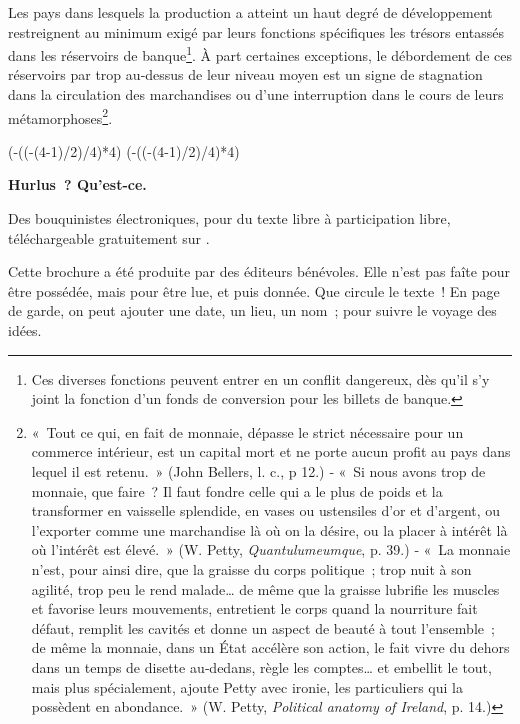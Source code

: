 \documentclass[french,twoside]{book} %
\def\truncdiv#1#2{((#1-(#2-1)/2)/#2)}
\def\moduloop#1#2{(#1-\truncdiv{#1}{#2}*#2)}
\def\modulo#1#2{\number\numexpr\moduloop{#1}{#2}\relax}
\begin{document}
Les pays dans lesquels la production a atteint un haut degré de développement restreignent au minimum exigé par leurs fonctions spécifiques les trésors entassés dans les réservoirs de banque\footnote{Ces diverses fonctions peuvent entrer en un conflit dangereux, dès qu’il s’y joint la fonction d’un fonds de conversion pour les billets de banque.}. À part certaines exceptions, le débordement de ces réservoirs par trop au‑dessus de leur niveau moyen est un signe de stagnation dans la circulation des marchandises ou d’une interruption dans le cours de leurs métamorphoses\footnote{« Tout ce qui, en fait de monnaie, dépasse le strict nécessaire pour un commerce intérieur, est un capital mort et ne porte aucun profit au pays dans lequel il est retenu. » (John Bellers, l. c., p 12.) ‑ « Si nous avons trop de monnaie, que faire ? Il faut fondre celle qui a le plus de poids et la transformer en vaisselle splendide, en vases ou ustensiles d’or et d’argent, ou l’exporter comme une marchandise là où on la désire, ou la placer à intérêt là où l’intérêt est élevé. » (W. Petty, \emph{Quantulumeumque}, p. 39.) ‑ « La monnaie n’est, pour ainsi dire, que la graisse du corps politique ; trop nuit à son agilité, trop peu le rend malade… de même que la graisse lubrifie les muscles et favorise leurs mouvements, entretient le corps quand la nourriture fait défaut, remplit les cavités et donne un aspect de beauté à tout l’ensemble ; de même la monnaie, dans un État accélère son action, le fait vivre du dehors dans un temps de disette au‑dedans, règle les comptes… et embellit le tout, mais plus spécialement, ajoute Petty avec ironie, les particuliers qui la possèdent en abondance. » (W. Petty, \emph{Political anatomy of Ireland}, p. 14.)}.
 


\ifbooklet
  \pagestyle{empty}
  \clearpage
  \ifnum\modulo{\value{page}}{4}=0 \hbox{}\newpage\hbox{}\newpage\fi
  \ifnum\modulo{\value{page}}{4}=1 \hbox{}\newpage\hbox{}\newpage\fi


  \hbox{}\newpage
  \ifodd\value{page}\hbox{}\newpage\fi
  {\centering\color{rubric}\bfseries\noindent\large
    Hurlus ? Qu’est-ce.\par
    \bigskip
  }
  \noindent Des bouquinistes électroniques, pour du texte libre à participation libre,
  téléchargeable gratuitement sur \href{https://hurlus.fr}{}.\par
  \bigskip
  \noindent Cette brochure a été produite par des éditeurs bénévoles.
  Elle n’est pas faîte pour être possédée, mais pour être lue, et puis donnée.
  Que circule le texte !
  En page de garde, on peut ajouter une date, un lieu, un nom ; pour suivre le voyage des idées.
  \par
\end{document}
